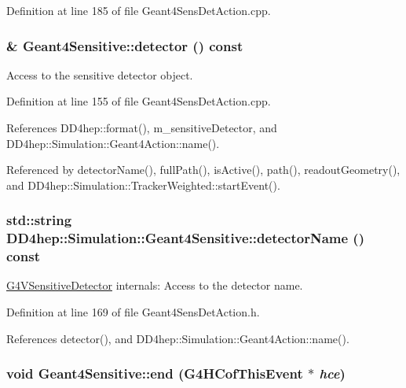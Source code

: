 Definition at line 185 of file Geant4SensDetAction.cpp.\hypertarget{class_d_d4hep_1_1_simulation_1_1_geant4_sensitive_addca9fecaf087a7ce495960cae4cc8cc}{
\subsubsection[{detector}]{ \& Geant4Sensitive::detector () const}}
\label{class_d_d4hep_1_1_simulation_1_1_geant4_sensitive_addca9fecaf087a7ce495960cae4cc8cc}


Access to the sensitive detector object. 

Definition at line 155 of file Geant4SensDetAction.cpp.

References DD4hep::format(), m\_\-sensitiveDetector, and DD4hep::Simulation::Geant4Action::name().

Referenced by detectorName(), fullPath(), isActive(), path(), readoutGeometry(), and DD4hep::Simulation::TrackerWeighted::startEvent().\hypertarget{class_d_d4hep_1_1_simulation_1_1_geant4_sensitive_aebef8cd9fe54668ef5d19c481aef1452}{
\subsubsection[{detectorName}]{\setlength{\rightskip}{0pt plus 5cm}std::string DD4hep::Simulation::Geant4Sensitive::detectorName () const}}
\label{class_d_d4hep_1_1_simulation_1_1_geant4_sensitive_aebef8cd9fe54668ef5d19c481aef1452}


\hyperlink{class_g4_v_sensitive_detector}{G4VSensitiveDetector} internals: Access to the detector name. 

Definition at line 169 of file Geant4SensDetAction.h.

References detector(), and DD4hep::Simulation::Geant4Action::name().\hypertarget{class_d_d4hep_1_1_simulation_1_1_geant4_sensitive_abcce05101539a9941c06aada4625a608}{
\subsubsection[{end}]{\setlength{\rightskip}{0pt plus 5cm}void Geant4Sensitive::end (G4HCofThisEvent $\ast$ {\em hce})}}
\label{class_d_d4hep_1_1_simulation_1_1_geant4_sensitive_abcce05101539a9941c06aada4625a608}


